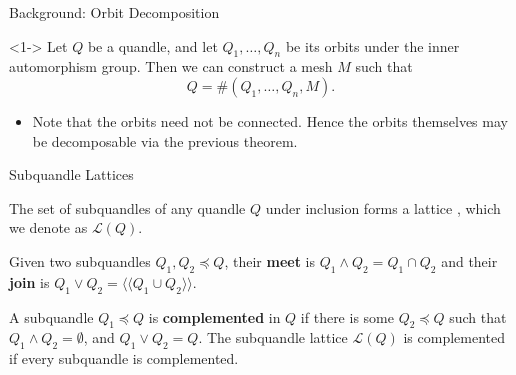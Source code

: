 \documentclass[10pt]{beamer}
\newcommand{\cL}{\mathcal{L}}
\newcommand{\qgen}[1]{\langle\langle#1\rangle\rangle}
\newcommand{\sq}{\preccurlyeq} %
\theoremstyle{plain}
\begin{document}
    \begin{frame}{Background: Orbit Decomposition}

        \begin{theorem}<1->\cite{ehrman2008toward}
        Let $Q$ be a quandle, and let $Q_1,\dots, Q_n$ be its orbits under the inner automorphism group. Then we can construct a mesh $M$ such that 
        \[Q = \#(Q_1, \dots, Q_n, M).\]
        \end{theorem}
        \vspace{0.15in}
        \begin{itemize}
        
            \item<2-> Note that the orbits need not be connected. Hence the orbits themselves may be decomposable via the previous theorem. 
        
        \end{itemize}
        
            
        \end{frame}

        
    \begin{frame}{Subquandle Lattices}

        \begin{definition}
        The set of subquandles of any quandle $Q$ under inclusion forms a lattice \cite{saki2021complemented}, which we denote as $\cL(Q)$. 
        \end{definition}
        \pause
        
        \begin{definition}
        Given two subquandles $Q_1, Q_2\sq Q$, their \textbf{meet} is $Q_1\wedge Q_2 = Q_1\cap Q_2$ and their \textbf{join} is $Q_1\vee Q_2 =  \qgen{Q_1\cup Q_2}$.
        \end{definition}
        \pause
        
        \begin{definition}
        A subquandle $Q_1\sq Q$ is \textbf{complemented} in $Q$ if there is some $Q_2\sq Q$ such that $Q_1 \wedge Q_2 = \emptyset$, and $Q_1\vee Q_2 = Q$. The subquandle lattice $\cL(Q)$ is complemented if every subquandle is complemented.
        \end{definition}
    \end{frame}
\end{document}
